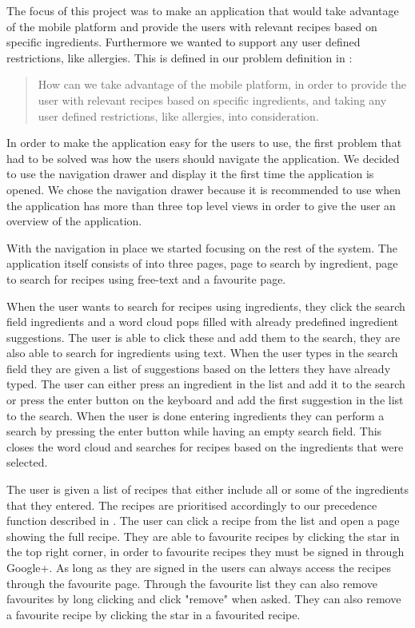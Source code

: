 The focus of this project was to make an application that would take advantage of the mobile platform and provide the users with relevant recipes based on specific ingredients. Furthermore we wanted to support any user defined restrictions, like allergies.
This is defined in our problem definition in :
\begin{quote}
How can we take advantage of the mobile platform, in order to provide the user with relevant recipes based on specific ingredients, and taking any user defined restrictions, like allergies, into consideration.
\end{quote}
In order to make the application easy for the users to use, the first problem that had to be solved was how the users should navigate the application. We decided to use the navigation drawer and display it the first time the application is opened. We chose the navigation drawer because it is recommended to use when the application has more than three top level views in order to give the user an overview of the application.

With the navigation in place we started focusing on the rest of the system. The application itself consists of into three pages, page to search by ingredient, page to search for recipes using free-text and a favourite page. 

When the user wants to search for recipes using ingredients, they click the search field ingredients and a word cloud pops filled with already predefined ingredient suggestions. The user is able to click these and add them to the search, they are also able to search for ingredients using text. When the user types in the search field they are given a list of suggestions based on the letters they have already typed. The user can either press an ingredient in the list and add it to the search or press the enter button on the keyboard and add the first suggestion in the list to the search. When the user is done entering ingredients they can perform a search by pressing the enter button while having an empty search field. This closes the word cloud and searches for recipes based on the ingredients that were selected. 

The user is given a list of recipes that either include all or some of the ingredients that they entered. The recipes are prioritised accordingly to our precedence function described in . The user can click a recipe from the list and open a page showing the full recipe. They are able to favourite recipes by clicking the star in the top right corner, in order to favourite recipes they must be signed in through Google+. As long as they are signed in the users can always access the recipes through the favourite page. Through the favourite list they can also remove favourites by long clicking and click "remove" when asked. They can also remove a favourite recipe by clicking the star in a favourited recipe.

